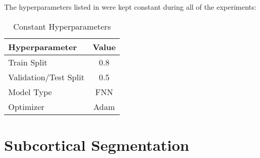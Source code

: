\label{experiments}

The hyperparameters listed in  were kept constant during all of the experiments:
\begin{table}[H]
\centering
\begin{tabular}{|l|c|}
\hline
\textbf{Hyperparameter} & \textbf{Value} \\ \hline
Train Split & 0.8 \\ \hline
Validation/Test Split & 0.5 \\ \hline
Model Type & \ac{FNN} \\ \hline
Optimizer & Adam \\ \hline
\end{tabular}
\caption{Constant Hyperparameters}
\label{tab:hypcom}
\end{table}

\section{Subcortical Segmentation}

